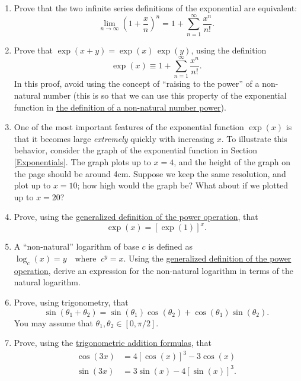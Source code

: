 \documentclass[10pt,a4paper]{article}
\begin{document}
\begin{enumerate}
\item 
  Prove that the two infinite series definitions of the exponential
  are equivalent:
  \begin{equation*}
    \lim_{n\rightarrow\infty} \left(1+\frac{x}{n}\right)^n = 1 +
    \sum_{n=1}^\infty\frac{x^n}{n!}.
  \end{equation*}

\item
  Prove that $\exp(x+y) = \exp(x)\,\exp(y)$, using the
  definition
  \begin{equation*}
    \exp(x) \equiv 1 + \sum_{n=1}^\infty\frac{x^n}{n!}.    
  \end{equation*}
  In this proof, avoid using the concept of ``raising to the power''
  of a non-natural number (this is so that we can use this property of
  the exponential function in \hyperref[powerdef]{the definition of a
    non-natural number power}).

\item
  One of the most important features of the exponential function
  $\exp(x)$ is that it becomes large \textit{extremely} quickly with
  increasing $x$. To illustrate this behavior, consider the graph of
  the exponential function in Section \ref{Exponentials}. The graph
  plots up to $x = 4$, and the height of the graph on the page should
  be around 4cm. Suppose we keep the same resolution, and plot up to
  $x = 10$; how high would the graph be?  What about if we plotted up
  to $x = 20$?

\item
  Prove, using the \hyperref[powerdef]{generalized definition of the
    power operation}, that
  \begin{equation*}
    \exp(x) = [\exp(1)]^x.
  \end{equation*}

\item
  A ``non-natural'' logarithm of base $c$ is defined as $\log_c(x) = y
  \quad\mathrm{where}\;\; c^y = x$.  Using the
  \hyperref[exponential]{generalized definition of the power
    operation}, derive an expression for the non-natural logarithm in
  terms of the natural logarithm.

\item
  Prove, using trigonometry, that
  \begin{equation*}
    \sin(\theta_1 + \theta_2) = \sin(\theta_1) \cos(\theta_2) +
    \cos(\theta_1)\sin(\theta_2).
  \end{equation*}
  You may assume that $\theta_1, \theta_2 \in [0, \pi/2].$

\item
  Prove, using the \hyperref[trigo]{trigonometric addition formulas},
  that
  \begin{align*} \cos(3x) &= 4[\cos(x)]^3 -3\cos(x)
  \\ \sin(3x) &= 3\sin(x)-4[\sin(x)]^3.
  \end{align*}
\end{enumerate}
\end{document}
